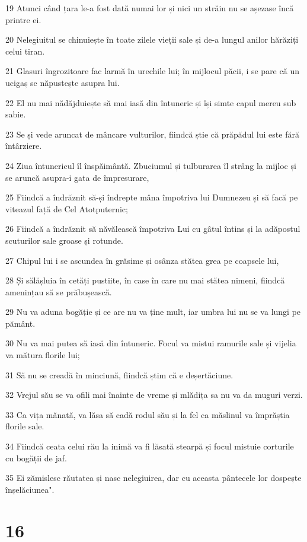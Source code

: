 \par 19 Atunci când țara le-a fost dată numai lor și nici un străin nu se așezase încă printre ei.
\par 20 Nelegiuitul se chinuiește în toate zilele vieții sale și de-a lungul anilor hărăziți celui tiran.
\par 21 Glasuri îngrozitoare fac larmă în urechile lui; în mijlocul păcii, i se pare că un ucigaș se năpustește asupra lui.
\par 22 El nu mai nădăjduiește să mai iasă din întuneric și își simte capul mereu sub sabie.
\par 23 Se și vede aruncat de mâncare vulturilor, fiindcă știe că prăpădul lui este fără întârziere.
\par 24 Ziua întunericul îl înspăimântă. Zbuciumul și tulburarea îl strâng la mijloc și se aruncă asupra-i gata de împresurare,
\par 25 Fiindcă a îndrăznit să-și îndrepte mâna împotriva lui Dumnezeu și să facă pe viteazul față de Cel Atotputernic;
\par 26 Fiindcă a îndrăznit să năvălească împotriva Lui cu gâtul întins și la adăpostul scuturilor sale groase și rotunde.
\par 27 Chipul lui i se ascundea în grăsime și osânza stătea grea pe coapsele lui,
\par 28 Și sălășluia în cetăți pustiite, în case în care nu mai stătea nimeni, fiindcă amenințau să se prăbușească.
\par 29 Nu va aduna bogăție și ce are nu va ține mult, iar umbra lui nu se va lungi pe pământ.
\par 30 Nu va mai putea să iasă din întuneric. Focul va mistui ramurile sale și vijelia va mătura florile lui;
\par 31 Să nu se creadă în minciună, fiindcă știm că e deșertăciune.
\par 32 Vrejul său se va ofili mai înainte de vreme și mlădița sa nu va da muguri verzi.
\par 33 Ca vița mănată, va lăsa să cadă rodul său și la fel ca măslinul va împrăștia florile sale.
\par 34 Fiindcă ceata celui rău la inimă va fi lăsată stearpă și focul mistuie corturile cu bogății de jaf.
\par 35 Ei zămislesc răutatea și nasc nelegiuirea, dar cu aceasta pântecele lor dospește înșelăciunea".

\chapter{16}

